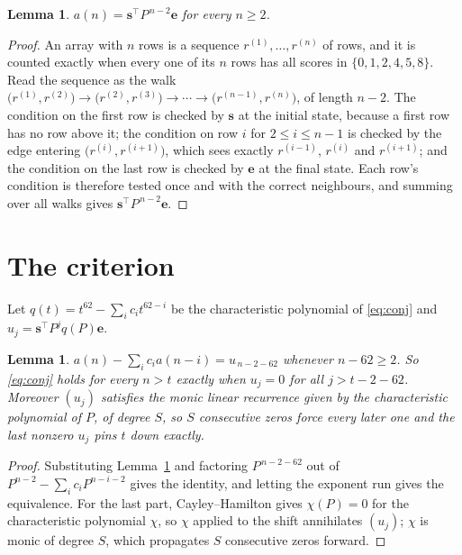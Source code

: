 \documentclass[11pt,a4paper]{article}
\theoremstyle{plain}
\newtheorem{lemma}[theorem]{Lemma}
\theoremstyle{definition}
\begin{document}
\begin{lemma}\label{lem:walk}
$a(n)=\mathbf{s}^{\!\top}P^{\,n-2}\mathbf{e}$ for every $n\ge2$.
\end{lemma}

\begin{proof}
An array with $n$ rows is a sequence $r^{(1)},\dots,r^{(n)}$ of rows, and it is counted
exactly when every one of its $n$ rows has all scores in $\{0,1,2,4,5,8\}$. Read the sequence as the
walk $\bigl(r^{(1)},r^{(2)}\bigr)\to\bigl(r^{(2)},r^{(3)}\bigr)\to\cdots\to
\bigl(r^{(n-1)},r^{(n)}\bigr)$, of length $n-2$. The condition on the first row is
checked by $\mathbf{s}$ at the initial state, because a first row has no row above it; the
condition on row $i$ for $2\le i\le n-1$ is checked by the edge entering
$\bigl(r^{(i)},r^{(i+1)}\bigr)$, which sees exactly $r^{(i-1)}$, $r^{(i)}$ and
$r^{(i+1)}$; and the condition on the last row is checked by $\mathbf{e}$ at the final
state. Each row's condition is therefore tested once and with the correct neighbours, and
summing over all walks gives $\mathbf{s}^{\!\top}P^{\,n-2}\mathbf{e}$.
\end{proof}

\section{The criterion}

Let $q(t)=t^{62}-\sum_i c_i t^{62-i}$ be the characteristic polynomial of
\eqref{eq:conj} and $u_j=\mathbf{s}^{\!\top}P^{j}q(P)\mathbf{e}$.

\begin{lemma}\label{lem:crit}
$a(n)-\sum_i c_i a(n-i)=u_{\,n-2-62}$ whenever $n-62\ge2$. So \eqref{eq:conj}
holds for every $n>t$ exactly when $u_j=0$ for all $j>t-2-62$. Moreover $(u_j)$
satisfies the monic linear recurrence given by the characteristic polynomial of $P$, of
degree $S$, so $S$ consecutive zeros force every later one and the last nonzero $u_j$ pins
$t$ down exactly.
\end{lemma}

\begin{proof}
Substituting Lemma~\ref{lem:walk} and factoring $P^{\,n-2-62}$ out of
$P^{n-2}-\sum_i c_i P^{n-i-2}$ gives the identity, and letting the exponent run gives the
equivalence. For the last part, Cayley--Hamilton gives $\chi(P)=0$ for the characteristic
polynomial $\chi$, so $\chi$ applied to the shift annihilates $(u_j)$; $\chi$ is monic of
degree $S$, which propagates $S$ consecutive zeros forward.
\end{proof}
\end{document}
